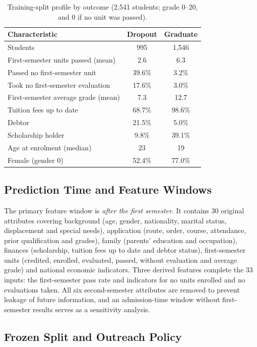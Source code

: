 \begin{table}[!htb]
\centering
\caption{Training-split profile by outcome (2,541 students; grade 0--20, and 0 if no unit was passed).}
\label{tab:eda}
\footnotesize
\setlength{\tabcolsep}{4pt}
\begin{tabular}{@{}lcc@{}}
\toprule
\textbf{Characteristic} & \textbf{Dropout} & \textbf{Graduate} \\
\midrule
Students & 995 & 1,546 \\
First-semester units passed (mean) & 2.6 & 6.3 \\
Passed no first-semester unit & 39.6\% & 3.2\% \\
Took no first-semester evaluation & 17.6\% & 3.0\% \\
First-semester average grade (mean) & 7.3 & 12.7 \\
Tuition fees up to date & 68.7\% & 98.6\% \\
Debtor & 21.5\% & 5.0\% \\
Scholarship holder & 9.8\% & 39.1\% \\
Age at enrolment (median) & 23 & 19 \\
Female (gender 0) & 52.4\% & 77.0\% \\
\bottomrule
\end{tabular}
\end{table}

\subsection{Prediction Time and Feature Windows}

The primary feature window is \emph{after the first semester}. It contains 30 original attributes
covering background (age, gender, nationality, marital status, displacement and special needs),
application (route, order, course, attendance, prior qualification and grades), family (parents'
education and occupation), finances (scholarship, tuition fees up to date and debtor status),
first-semester units (credited, enrolled, evaluated, passed, without evaluation and average grade)
and national economic indicators. Three derived features complete the 33 inputs: the
first-semester pass rate and indicators for no units enrolled and no evaluations taken. All six
second-semester attributes are removed to prevent leakage of future information, and an
admission-time window without first-semester results serves as a sensitivity analysis.

\subsection{Frozen Split and Outreach Policy}

